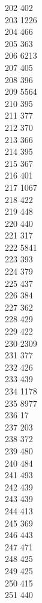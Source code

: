 { 202	402 \\
 203	1226 \\
 204	466 \\
 205	363 \\
 206	6213 \\
 207	405 \\
 208	396 \\
 209	5564 \\
 210	395 \\
 211	377 \\
 212	370 \\
 213	366 \\
 214	395 \\
 215	367 \\
 216	401 \\
 217	1067 \\
 218	422 \\
 219	448 \\
 220	440 \\
 221	317 \\
 222	5841 \\
 223	393 \\
 224	379 \\
 225	437 \\
 226	384 \\
 227	362 \\
 228	429 \\
 229	422 \\
 230	2309 \\
 231	377 \\
 232	426 \\
 233	439 \\
 234	1178 \\
 235	8977 \\
 236	17 \\
 237	203 \\
 238	372 \\
 239	480 \\
 240	484 \\
 241	493 \\
 242	439 \\
 243	439 \\
 244	413 \\
 245	369 \\
 246	443 \\
 247	471 \\
 248	425 \\
 249	425 \\
 250	415 \\
 251	440 \\
}
